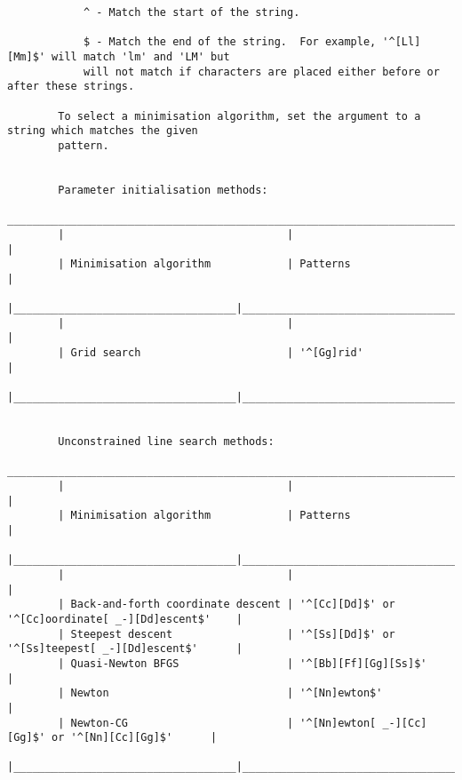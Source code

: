 \begin{verbatim}
            ^ - Match the start of the string.
    
            $ - Match the end of the string.  For example, '^[Ll][Mm]$' will match 'lm' and 'LM' but
            will not match if characters are placed either before or after these strings.
    
        To select a minimisation algorithm, set the argument to a string which matches the given
        pattern.
    
    
        Parameter initialisation methods:
        ___________________________________________________________________________________________
        |                                   |                                                     |
        | Minimisation algorithm            | Patterns                                            |
        |___________________________________|_____________________________________________________|
        |                                   |                                                     |
        | Grid search                       | '^[Gg]rid'                                          |
        |___________________________________|_____________________________________________________|
    
    
        Unconstrained line search methods:
        ___________________________________________________________________________________________
        |                                   |                                                     |
        | Minimisation algorithm            | Patterns                                            |
        |___________________________________|_____________________________________________________|
        |                                   |                                                     |
        | Back-and-forth coordinate descent | '^[Cc][Dd]$' or '^[Cc]oordinate[ _-][Dd]escent$'    |
        | Steepest descent                  | '^[Ss][Dd]$' or '^[Ss]teepest[ _-][Dd]escent$'      |
        | Quasi-Newton BFGS                 | '^[Bb][Ff][Gg][Ss]$'                                |
        | Newton                            | '^[Nn]ewton$'                                       |
        | Newton-CG                         | '^[Nn]ewton[ _-][Cc][Gg]$' or '^[Nn][Cc][Gg]$'      |
        |___________________________________|_____________________________________________________|
    

\end{verbatim}
